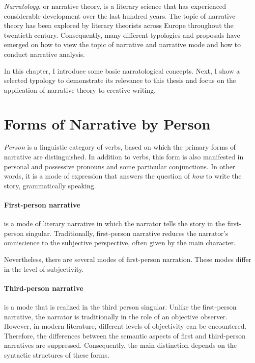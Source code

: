 \emph{Narratology}, or narrative theory, is a literary science that has experienced considerable development over the last hundred years. The topic of narrative theory has been explored by literary theorists across Europe throughout the twentieth century. Consequently, many different typologies and proposals have emerged on how to view the topic of narrative and narrative mode and how to conduct narrative analysis. \cite{kubicek-vypravec}

In this chapter, I introduce some basic narratological concepts. Next, I show a selected typology to demonstrate its relevance to this thesis and focus on the application of narrative theory to creative writing.

\section{Forms of Narrative by Person}
\label{forms-of-narrative}

\emph{Person} is a linguistic category of verbs, based on which the primary forms of narrative are distinguished. In addition to verbs, this form is also manifested in personal and possessive pronouns and some particular conjunctions. In other words, it is a mode of expression that answers the question of \emph{how} to write the story, grammatically speaking.\cite{docekalova}

\paragraph{First-person narrative} is a mode of literary narrative in which the narrator tells the story in the first-person singular. Traditionally, first-person narrative reduces the narrator's omniscience to the subjective perspective, often given by the main character. \cite{vlasin-slovnik}

Nevertheless, there are several modes of first-person narration. These modes differ in the level of subjectivity. \cite{dolezel-narativni-zpusoby}

\paragraph{Third-person narrative} is a mode that is realized in the third person singular. Unlike the first-person narrative, the narrator is traditionally in the role of an objective observer. However, in modern literature, different levels of objectivity can be encountered. Therefore, the differences between the semantic aspects of first and third-person narratives are suppressed. Consequently, the main distinction depends on the syntactic structures of these forms. \cite{vlasin-slovnik}

